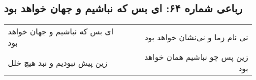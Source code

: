 \begin{center}
\section*{رباعی شماره ۶۴: ای بس که نباشیم و جهان خواهد بود}
\label{sec:sh064}
\begin{longtable}{l p{0.5cm} r}
ای بس که نباشیم و جهان خواهد بود
&&
نی نام زما و نی‌نشان خواهد بود
\\
زین پیش نبودیم و نبد هیچ خلل
&&
زین پس چو نباشیم همان خواهد بود
\\
\end{longtable}
\end{center}

